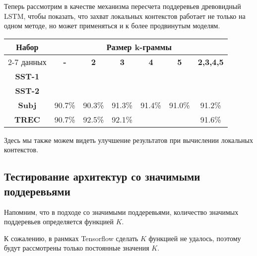 Теперь рассмотрим в качестве механизма пересчета поддеревьев древовидный LSTM, 
чтобы показать, что захват локальных контекстов работает не только на одном методе, 
но может применяться и к более продвинутым моделям.

\vspace{5mm}
\noindent \begin{minipage}{\linewidth}
 \label{tab:title} 
\begin{tabular}{|c|c|c|c|c|c|c|}
\hline
\multirow{2}{*}{Набор}   &                \multicolumn{6}{c|}{Размер k-граммы} \\ \cline{2-7} 
     данных              & \textbf{-}   &   \textbf{2} & \textbf{3} & \textbf{4} & \textbf{5} & \textbf{2,3,4,5} \\ \hline
\textbf{SST-1}           &              &              &            &            &            & \\ \hline
\textbf{SST-2}           &              &              &            &            &            & \\ \hline
\textbf{Subj}            & 90.7\%       &  90.3\%      & 91.3\%     & 91.4\%     &   91.0\%   &  91.2\% \\ \hline
\textbf{TREC}            & 90.7\%       &  92.5\%      & 92.1\%     &            &            &  91.6\% \\ \hline
\end{tabular}
\end{minipage}
\vspace{5mm}

Здесь мы также можем видеть улучшение результатов при вычислении локальных контекстов.

\subsection{Тестирование архитектур со значимыми поддеревьями}

Напомним, что в подходе со значимыми поддеревьями, количество значимых поддеревьев определяется функцией $K$.

К сожалению, в ранмках Tensorflow сделать $K$ функцией не удалось, поэтому будут рассмотрены только постоянные значения $K$.


